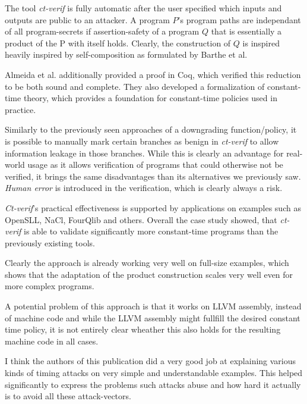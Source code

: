 \documentclass[a4paper,UKenglish]{lipics-v2018}
\begin{document}
The tool \textit{ct-verif} is fully automatic after the user specified which inputs and outputs are public to an attacker. A program $P$'s program paths are independant of all program-secrets if assertion-safety of a program $Q$ that is essentially a product of the P with itself holds.\cite{verifying_constant_time_implementations} Clearly, the construction of $Q$ is inspired heavily inspired by self-composition as formulated by Barthe et al.\cite{information_flow_by_self_composition} 

Almeida et al. additionally provided a proof in Coq, which verified this reduction to be both sound and complete. They also developed a formalization of constant-time theory, which provides a foundation for constant-time policies used in practice.\cite{verifying_constant_time_implementations} 

Similarly to the previously seen approaches of a downgrading function/policy, it is possible to manually mark certain branches as benign in \textit{ct-verif} to allow information leakage in those branches. While this is clearly an advantage for real-world usage as it allows verification of programs that could otherwise not be verified, it brings the same disadvantages than its alternatives we previously saw. \textit{Human error} is introduced in the verification, which is clearly always a risk.

\textit{Ct-verif}'s practical effectiveness is supported by applications on examples such as OpenSLL, NaCl, FourQlib and others. Overall the case study showed, that \textit{ct-verif} is able to validate significantly more constant-time programs than the previously existing tools.
\cite{verifying_constant_time_implementations}

Clearly the approach is already working very well on full-size examples, which shows that the adaptation of the product construction scales very well even for more complex programs.
\cite{verifying_constant_time_implementations}

A potential problem of this approach is that it works on LLVM assembly, instead of machine code and while the LLVM assembly might fullfill the desired constant time policy, it is not entirely clear wheather this also holds for the resulting machine code in all cases.\cite{verifying_constant_time_implementations}

I think the authors of this publication did a very good job at explaining various kinds of timing attacks on very simple and understandable examples. This helped significantly to express the problems such attacks abuse and how hard it actually is to avoid all these attack-vectors.
\end{document}
